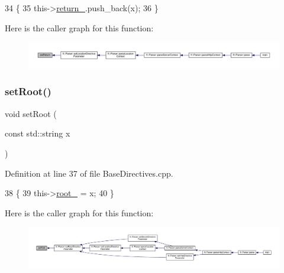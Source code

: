\begin{DoxyCode}
34     \{
35         this->\hyperlink{classft_1_1_location_block_abab721f365aff66f8a1289de21c8f01f}{return\_}.push\_back(x);
36     \}
\end{DoxyCode}
Here is the caller graph for this function\+:
\nopagebreak
\begin{figure}[H]
\begin{center}
\leavevmode
\includegraphics[width=350pt]{classft_1_1_location_block_a041d07c701e052b114ef353d5e588998_icgraph}
\end{center}
\end{figure}
\mbox{\label{classft_1_1_base_directives_a2a7990e309f7e38f2915dbbb0d2704cf}} 
\subsubsection{\texorpdfstring{set\+Root()}{setRoot()}}
{\footnotesize\ttfamily void set\+Root (\begin{DoxyParamCaption}\item[{const std\+::string}]{x }\end{DoxyParamCaption})\hspace{0.3cm}{\ttfamily [inherited]}}



Definition at line 37 of file Base\+Directives.\+cpp.


\begin{DoxyCode}
38     \{
39         this->\hyperlink{classft_1_1_base_directives_abb1eaf0bba10b90172d6152e69457dc7}{root\_} = x;
40     \}
\end{DoxyCode}
Here is the caller graph for this function\+:
\nopagebreak
\begin{figure}[H]
\begin{center}
\leavevmode
\includegraphics[width=350pt]{classft_1_1_base_directives_a2a7990e309f7e38f2915dbbb0d2704cf_icgraph}
\end{center}
\end{figure}


